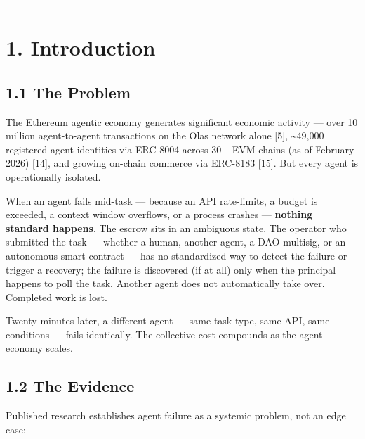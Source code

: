 \documentclass[
  10pt,
]{article}
\begin{document}
\begin{center}\rule{0.5\linewidth}{0.5pt}\end{center}

\hypertarget{introduction}{%
\section{1. Introduction}\label{introduction}}

\hypertarget{the-problem}{%
\subsection{1.1 The Problem}\label{the-problem}}

The Ethereum agentic economy generates significant economic activity ---
over 10 million agent-to-agent transactions on the Olas network alone
{[}5{]}, \textasciitilde49,000 registered agent identities via ERC-8004
across 30+ EVM chains (as of February 2026) {[}14{]}, and growing
on-chain commerce via ERC-8183 {[}15{]}. But every agent is
operationally isolated.

When an agent fails mid-task --- because an API rate-limits, a budget is
exceeded, a context window overflows, or a process crashes ---
\textbf{nothing standard happens}. The escrow sits in an ambiguous
state. The operator who submitted the task --- whether a human, another
agent, a DAO multisig, or an autonomous smart contract --- has no
standardized way to detect the failure or trigger a recovery; the
failure is discovered (if at all) only when the principal happens to
poll the task. Another agent does not automatically take over. Completed
work is lost.

Twenty minutes later, a different agent --- same task type, same API,
same conditions --- fails identically. The collective cost compounds as
the agent economy scales.

\hypertarget{the-evidence}{%
\subsection{1.2 The Evidence}\label{the-evidence}}

Published research establishes agent failure as a systemic problem, not
an edge case:
\end{document}
